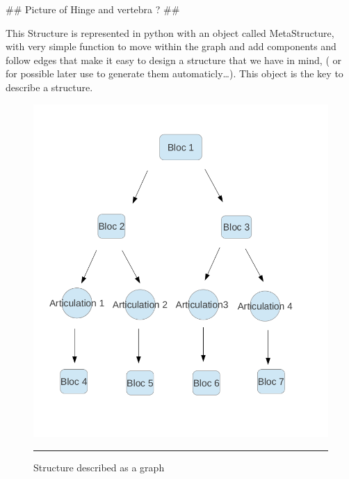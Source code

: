 ## Picture of Hinge and vertebra ? ##

This Structure is represented in python with an object called MetaStructure, with very simple function to move within the graph and add components and follow edges that make it easy to design a structure that we have in mind, ( or for possible later use to generate them automaticly\ldots). This object is the key to describe a structure.  


\begin{figure}[htbp]
    \centering
    \includegraphics[scale=0.5]{Figures/schema_arbre.png}
    \rule{35em}{0.5pt}
    \caption[Structure described as graph]{Structure described as a graph}
    \label{fig:Snake}
\end{figure}



